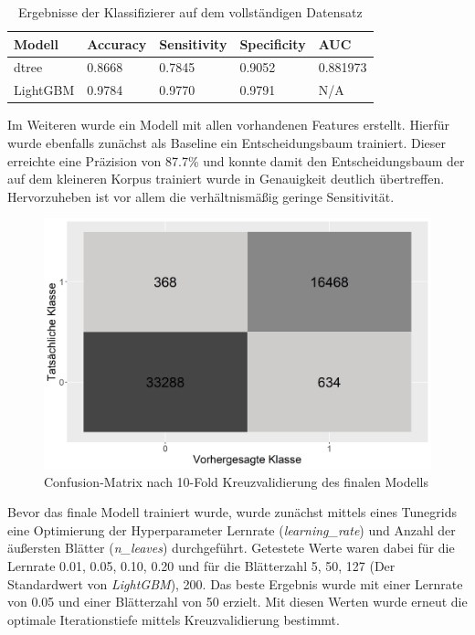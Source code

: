 \begin{table}
    \begin{center}
        \begin{tabularx}{\textwidth}{XXXXX}
            \toprule
            Modell & Accuracy & Sensitivity & Specificity & AUC\\
            \midrule
            dtree & 0.8668 & 0.7845 & 0.9052 & 0.881973 \\
            LightGBM\footnotemark & 0.9784 & 0.9770 & 0.9791 & N/A \\
            \bottomrule
        \end{tabularx}
        \caption{Ergebnisse der Klassifizierer auf dem vollständigen Datensatz}
        \label{full-model}
    \end{center}
\end{table}

Im Weiteren wurde ein Modell mit allen vorhandenen Features erstellt.
Hierfür wurde ebenfalls zunächst als Baseline ein Entscheidungsbaum trainiert.
Dieser erreichte eine Präzision von 87.7\% und konnte damit den Entscheidungsbaum der auf dem kleineren Korpus trainiert wurde in Genauigkeit deutlich übertreffen.
Hervorzuheben ist vor allem die verhältnismäßig geringe Sensitivität.

\begin{figure}[ht]
    \centering
    \includegraphics[scale=0.45]{graphics/confusion_matrix.jpg}
    \caption{Confusion-Matrix nach 10-Fold Kreuzvalidierung des finalen Modells}
    \label{confusion-table}
\end{figure}

Bevor das finale Modell trainiert wurde, wurde zunächst mittels eines Tunegrids eine Optimierung der Hyperparameter Lernrate (\textit{learning\_rate}) und Anzahl der äußersten Blätter (\textit{n\_leaves}) durchgeführt.
Getestete Werte waren dabei für die Lernrate 0.01, 0.05, 0.10, 0.20 und für die Blätterzahl 5, 50, 127 (Der Standardwert von \textit{LightGBM}), 200.
Das beste Ergebnis wurde mit einer Lernrate von 0.05 und einer Blätterzahl von 50 erzielt.
Mit diesen Werten wurde erneut die optimale Iterationstiefe mittels Kreuzvalidierung bestimmt.

